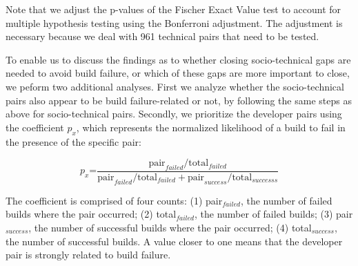 Note that we adjust the p-values of the Fischer Exact Value test to account for multiple hypothesis testing using the Bonferroni adjustment.
The adjustment is necessary because we deal with 961 technical pairs that need to be tested. 

To enable us to discuss the findings as to whether closing socio-technical gaps
are needed to avoid build failure, or which of these gaps are more important to
close, we peform two additional analyses. 
First we analyze whether the
socio-technical pairs also appear to be build failure-related or not, by
following the same steps as above for socio-technical pairs. 
%
Secondly, we prioritize the developer pairs using the coefficient $p_x$,
which represents the normalized likelihood of a build
to fail in the presence of the specific pair:

\begin{equation}
p_x\text{=}\frac{ \text{pair}_{failed} / \text{total}_{failed} }
                     { \text{pair}_{failed} / \text{total}_{failed} + \text{pair}_{success} / \text{total}_{successs}}
\end{equation}

The coefficient is comprised of four counts: (1) pair$_{failed}$, the number of failed builds where the pair occurred; (2) total$_{failed}$, the number of failed builds; (3) pair$_{success}$, the number of successful builds where the pair occurred; (4) total$_{success}$, the number of successful builds.
A value closer to one means that the developer pair is strongly related to build
failure. %




